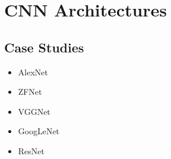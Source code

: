 \section{CNN Architectures}
\subsection{Case Studies}
\begin{itemize}
	\item AlexNet
	\item ZFNet
	\item VGGNet
	\item GoogLeNet
	\item ResNet
\end{itemize}